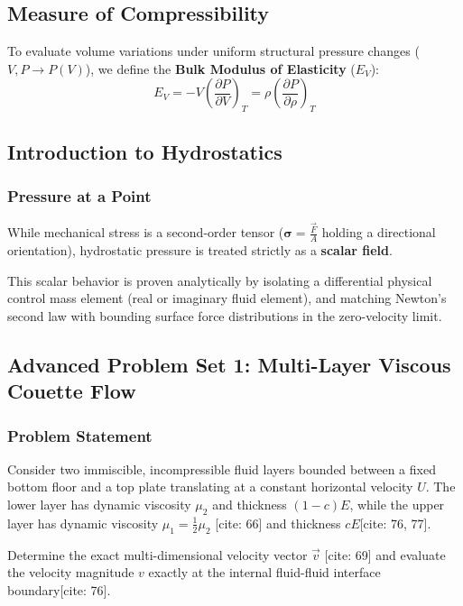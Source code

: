 \subsection{Measure of Compressibility}

To evaluate volume variations under uniform structural pressure changes ($V, P \to P(V)$), we define the \textbf{Bulk Modulus of Elasticity} ($E_V$):
\begin{equation}
    E_V = -V \left(\frac{\partial P}{\partial V}\right)_T = \rho \left(\frac{\partial P}{\partial \rho}\right)_T
\end{equation}

\subsection{Introduction to Hydrostatics}

\subsubsection{Pressure at a Point}
While mechanical stress is a second-order tensor ($\boldsymbol{\sigma} = \frac{\vec{F}}{A}$ holding a directional orientation), hydrostatic pressure is treated strictly as a \textbf{scalar field}. 

This scalar behavior is proven analytically by isolating a differential physical control mass element (real or imaginary fluid element), and matching Newton's second law with bounding surface force distributions in the zero-velocity limit.

\newpage
\subsection{Advanced Problem Set 1: Multi-Layer Viscous Couette Flow}

\subsubsection{Problem Statement}
Consider two immiscible, incompressible fluid layers bounded between a fixed bottom floor and a top plate translating at a constant horizontal velocity $U$. The lower layer has dynamic viscosity $\mu_2$ and thickness $(1-c)E$, while the upper layer has dynamic viscosity $\mu_1 = \frac{1}{2}\mu_2$ [cite: 66] and thickness $cE$[cite: 76, 77]. 

Determine the exact multi-dimensional velocity vector $\vec{v}$ [cite: 69] and evaluate the velocity magnitude $v$ exactly at the internal fluid-fluid interface boundary[cite: 76].

